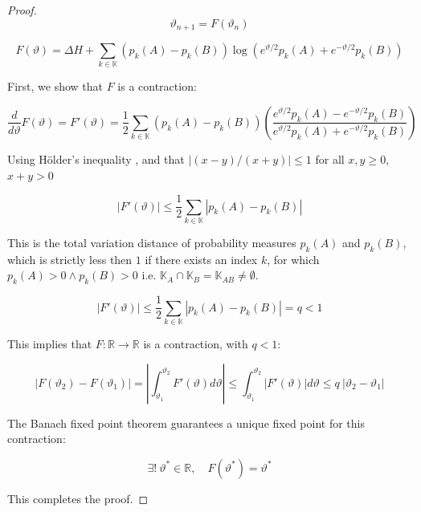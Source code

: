 \documentclass{article}
\theoremstyle{definition}
\begin{document}
\begin{proof}
\begin{equation}
    \vartheta_{n+1} = F(\vartheta_n)
\end{equation}

\begin{equation}
    \label{eq:Fdef}
    F(\vartheta) = \Delta H + \sum_{k \in \mathbb{K}} (p_k(A) - p_k(B))
                        \log \left ( e^{\vartheta/2} p_k(A) + e^{-\vartheta/2} p_k(B) \right )
\end{equation}

First, we show that $F$ is a contraction:

\begin{equation}
    \frac{d}{d \vartheta} F(\vartheta) = F'(\vartheta) = \frac{1}{2} \sum_{k \in \mathbb{K}} (p_k(A) - p_k(B))
                        \left ( \frac{e^{\vartheta/2} p_k(A) - e^{-\vartheta/2} p_k(B)}{e^{\vartheta/2} p_k(A) + e^{-\vartheta/2} p_k(B)} \right )
\end{equation}

Using Hölder's inequality \cite{book:Holder}, and that $|(x-y)/(x+y)| \le 1$ for all $x,y \ge 0$, $x+y>0$

\begin{equation}
    |F'(\vartheta)| \le \frac{1}{2} \sum_{k \in \mathbb{K}} |p_k(A) - p_k(B)|
\end{equation}

This is the total variation distance \cite{book:MarkovChainsMixingTimes} of probability measures $p_{k}(A)$ and $p_{k}(B)$, which is strictly less then $1$ if there exists an index $k$, for which $p_k(A) > 0 \wedge p_k(B)>0$ i.e. $\mathbb{K}_A \cap \mathbb{K}_B = \mathbb{K}_{AB} \ne \emptyset$.

\begin{equation}
    \label{eq:qdef}
    |F'(\vartheta)| \le \frac{1}{2} \sum_{k \in \mathbb{K}} |p_k(A) - p_k(B)| = q < 1
\end{equation}

This implies that $F:\mathbb{R} \to \mathbb{R}$ is a contraction, with $q<1$:

\begin{equation}
    |F(\vartheta_2) - F(\vartheta_1)| = \left | \int_{\vartheta_1}^{\vartheta_2} F'(\vartheta) d \vartheta \right | \le \int_{\vartheta_1}^{\vartheta_2} |F'(\vartheta)| d \vartheta \le q\ |\vartheta_2 - \vartheta_1|
\end{equation}

The Banach fixed point theorem \cite{book:BanachFixedPoint} guarantees a unique fixed point for this contraction:

\begin{equation}
    \exists! \ \vartheta^* \in \mathbb{R}, \quad F(\vartheta^*) = \vartheta^*
\end{equation}

This completes the proof.

\end{proof}
\end{document}
